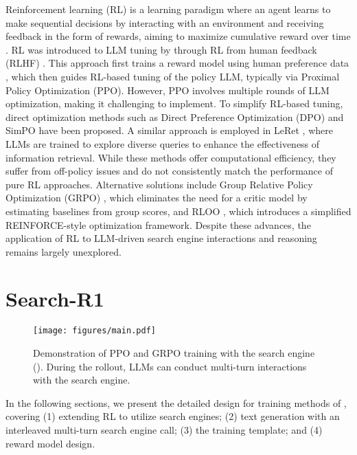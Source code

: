 Reinforcement learning (RL) \citep{kaelbling1996reinforcement} is a learning paradigm where an agent learns to make sequential decisions by interacting with an environment and receiving feedback in the form of rewards, aiming to maximize cumulative reward over time \citep{sutton1999reinforcement}. RL was introduced to LLM tuning by \cite{ouyang2022training} through RL from human feedback (RLHF) \citep{kaufmann2023survey}. This approach first trains a reward model using human preference data \citep{lambert2024rewardbench}, which then guides RL-based tuning of the policy LLM, typically via Proximal Policy Optimization (PPO). However, PPO involves multiple rounds of LLM optimization, making it challenging to implement.
To simplify RL-based tuning, direct optimization methods such as Direct Preference Optimization (DPO) \citep{rafailov2023direct} and SimPO \citep{meng2024simpo} have been proposed. 
A similar approach is employed in LeRet \citep{hsu2024grounding}, where LLMs are trained to explore diverse queries to enhance the effectiveness of information retrieval.
While these methods offer computational efficiency, they suffer from off-policy issues \citep{pang2024iterative} and do not consistently match the performance of pure RL approaches. Alternative solutions include Group Relative Policy Optimization (GRPO) \citep{shao2024deepseekmath}, which eliminates the need for a critic model by estimating baselines from group scores, and RLOO \citep{ahmadian2024back}, which introduces a simplified REINFORCE-style \citep{williams1992simple} optimization framework. 
Despite these advances, the application of RL to LLM-driven search engine interactions and reasoning remains largely unexplored.

\section{Search-R1}

\begin{figure}
    \centering\texttt{[image: figures/main.pdf]}
    \caption{Demonstration of PPO and GRPO training with the search engine (\Ours). During the rollout, LLMs can conduct multi-turn interactions with the search engine.}\label{fig:main}
\end{figure}

In the following sections, we present the detailed design for training methods of \Ours, covering (1) extending RL to utilize search engines; (2) text generation with an interleaved multi-turn search engine call; (3) the training template; and (4) reward model design.

